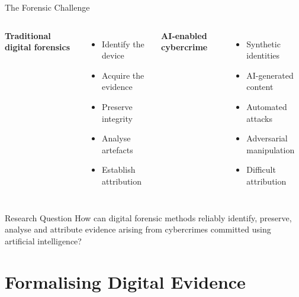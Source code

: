 \documentclass[aspectratio=169,11pt]{beamer}
\begin{document}
	
	\begin{frame}{The Forensic Challenge}
		
		\begin{columns}[T]
			
			
			\textbf{Traditional digital forensics}
			
			\begin{itemize}
				\item Identify the device
				\item Acquire the evidence
				\item Preserve integrity
				\item Analyse artefacts
				\item Establish attribution
			\end{itemize}
			
			
			\textbf{AI-enabled cybercrime}
			
			\begin{itemize}
				\item Synthetic identities
				\item AI-generated content
				\item Automated attacks
				\item Adversarial manipulation
				\item Difficult attribution
			\end{itemize}
			
		\end{columns}
		
		\vspace{0.5cm}
		
		\begin{alertblock}{Research Question}
			How can digital forensic methods reliably identify, preserve,
			analyse and attribute evidence arising from cybercrimes
			committed using artificial intelligence?
		\end{alertblock}
		
	\end{frame}
	
	
	\section{Formalising Digital Evidence}
	
\end{document}
